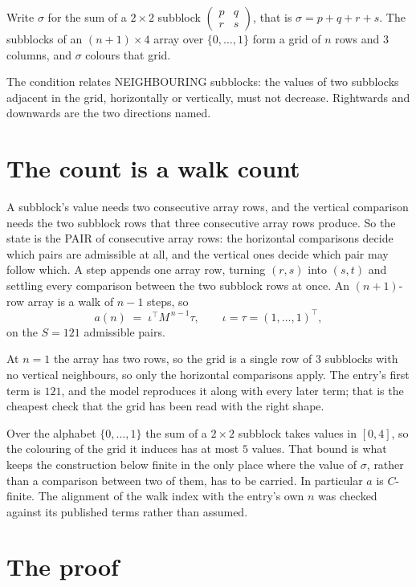 \documentclass[11pt,a4paper]{article}
\theoremstyle{plain}
\theoremstyle{definition}
\begin{document}
Write $\sigma$ for the sum of a $2\times2$ subblock
$\begin{pmatrix}p&q\\r&s\end{pmatrix}$, that is $\sigma=p+q+r+s$. The subblocks of an
$(n+1)\times4$ array over $\{0,\dots,1\}$ form a grid of $n$ rows and $3$
columns, and $\sigma$ colours that grid.

The condition relates NEIGHBOURING subblocks: the values of two subblocks adjacent in the grid,
horizontally or vertically, must not decrease. Rightwards and downwards are the two directions named.

\section{The count is a walk count}

A subblock's value needs two consecutive array rows, and the vertical
comparison needs the two subblock rows that three consecutive array rows produce. So the state
is the PAIR of consecutive array rows: the horizontal comparisons decide which pairs are
admissible at all, and the vertical ones decide which pair may follow which. A step appends one
array row, turning $(r,s)$ into $(s,t)$ and settling every comparison between the two subblock
rows at once. An $(n+1)$-row array is a walk of $n-1$ steps, so
\[
a(n)\;=\;\iota^{\!\top}M^{\,n-1}\tau,\qquad\iota=\tau=(1,\dots,1)^{\!\top},
\]
on the $S=121$ admissible pairs.

At $n=1$ the array has two rows, so the grid is a single row of $3$
subblocks with no vertical neighbours, so only the horizontal comparisons apply. The
entry's first term is $121$, and the model reproduces it along with every later term; that
is the cheapest check that the grid has been read with the right shape.

Over the alphabet $\{0,\dots,1\}$ the sum of a $2\times2$ subblock takes values in
$[0,4]$, so the colouring of the grid it induces has at most $5$ values.
That bound is what keeps the construction below finite in the only place where the value of
$\sigma$, rather than a comparison between two of them, has to be carried.
In particular $a$ is $C$-finite. The alignment of the walk index with the entry's own $n$ was
checked against its published terms rather than assumed.

\section{The proof}
\end{document}
